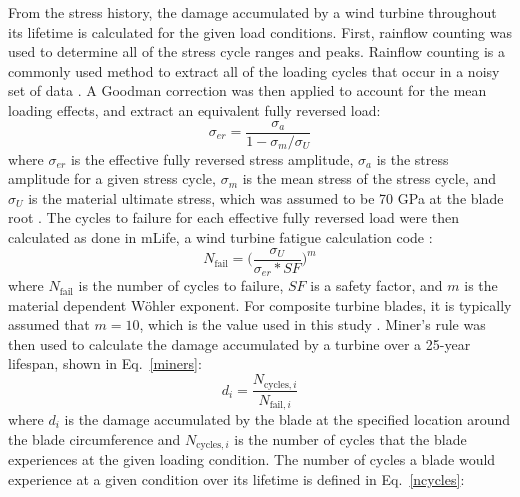 \documentclass[11pt,letterpaper]{article}
\begin{document}
From the stress history, the damage accumulated by a wind turbine throughout its lifetime is calculated for the given load conditions.
First, rainflow counting was used to determine all of the stress cycle ranges and peaks. Rainflow counting is a commonly used method to extract all of the loading cycles that occur in a noisy set of data \cite{matsuishi1968fatigue}.
A Goodman correction was then applied to account for the mean loading effects, and extract an equivalent fully reversed load:
\begin{equation}
    \sigma_{er} = \frac{\sigma_a}{1-\sigma_m/\sigma_U}
    \label{goodman}
\end{equation}
\noindent where $\sigma_{er}$ is the effective fully reversed stress amplitude, $\sigma_{a}$ is the stress amplitude for a given stress cycle, $\sigma_{m}$ is the mean stress of the stress cycle, and $\sigma_{U}$ is the material ultimate stress, which was assumed to be 70 GPa at the blade root \cite{mandell2003new}.
% 
The cycles to failure for each effective fully reversed load were then calculated as done in mLife, a wind turbine fatigue calculation code
\cite{hayman2012mlife}:
% 
\begin{equation}
    N_{\text{fail}} = \Big(\frac{\sigma_U}{\sigma_{er}*SF}\Big)^m
    \label{cycles}
\end{equation}
%
\noindent where $N_{\text{fail}}$ is the number of cycles to failure, $SF$ is a safety factor, and $m$ is the material dependent W\"{o}hler exponent. For composite turbine blades, it is typically assumed that $m=10$, which is the value used in this study \cite{Ingersoll2018}. 
Miner's rule was then used to calculate the damage accumulated by a turbine over a 25-year lifespan, shown in Eq.~\ref{miners}:
\begin{equation}
    d_i = \frac{N_{\text{cycles},i}}{N_{\text{fail},i}}
    \label{miners}
\end{equation}
\noindent where $d_i$ is the damage accumulated by the blade at the specified location around the blade circumference and $N_{\text{cycles},i}$ is the number of cycles that the blade experiences at the given loading condition. 
The number of cycles a blade would experience at a given condition over its lifetime is defined in Eq.~\ref{ncycles}:
\end{document}
